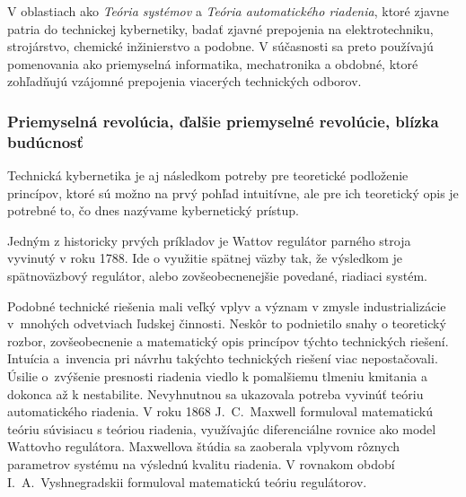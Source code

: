 \documentclass[a4paper, 10pt, ]{article}
\begin{document}
V oblastiach ako \emph{Teória systémov} a \emph{Teória automatického riadenia}, ktoré zjavne patria do technickej kybernetiky, badať zjavné prepojenia na elektrotechniku, strojárstvo, chemické inžinierstvo a podobne. V súčasnosti sa preto používajú pomenovania ako priemyselná informatika, mechatronika a obdobné, ktoré zohľadňujú vzájomné prepojenia viacerých technických odborov.





\subsubsection{Priemyselná revolúcia, ďalšie priemyselné revolúcie, blízka budúcnosť}

Technická kybernetika je aj následkom potreby pre teoretické podloženie princípov, ktoré sú možno na prvý pohľad intuitívne, ale pre ich teoretický opis je potrebné to, čo dnes nazývame kybernetický prístup.

Jedným z historicky prvých príkladov je Wattov regulátor parného stroja vyvinutý v roku 1788. Ide o využitie spätnej väzby tak, že výsledkom je spätnoväzbový regulátor, alebo zovšeobecnenejšie povedané, riadiaci systém.




Podobné technické riešenia mali veľký vplyv a význam v zmysle industrializácie v~mnohých odvetviach ľudskej činnosti. Neskôr to podnietilo snahy o teoretický rozbor, zovšeobecnenie a matematický opis princípov týchto technických riešení. Intuícia a~invencia pri návrhu takýchto technických riešení viac nepostačovali. Úsilie o~zvýšenie presnosti riadenia viedlo k pomalšiemu tlmeniu kmitania a dokonca až k nestabilite. Nevyhnutnou sa ukazovala potreba vyvinúť teóriu automatického riadenia. V roku 1868 J.~C.~Maxwell formuloval matematickú teóriu súvisiacu s teóriou riadenia, využívajúc diferenciálne rovnice ako model Wattovho regulátora. Maxwellova štúdia sa zaoberala vplyvom rôznych parametrov systému na výslednú kvalitu riadenia. V rovnakom období I.~A.~Vyshnegradskii formuloval matematickú teóriu regulátorov.
\end{document}
